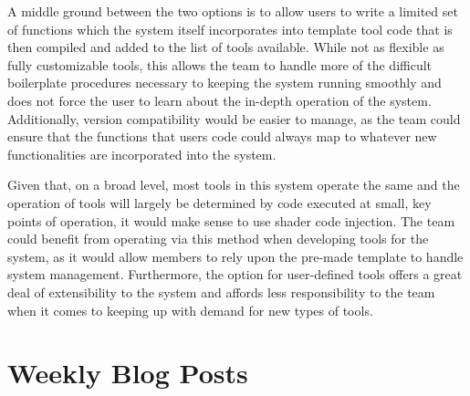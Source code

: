 \documentclass[onecolumn, draftclsnofoot,10pt, compsoc]{IEEEtran}
\newcounter{threesection}[subsubsection]
\begin{document}

A middle ground between the two options is to allow users to write a limited set of functions which the system itself incorporates into template tool code that is then compiled and added to the list of tools available.
While not as flexible as fully customizable tools, this allows the team to handle more of the difficult boilerplate procedures necessary to keeping the system running smoothly and does not force the user to learn about the in-depth operation of the system.
Additionally, version compatibility would be easier to manage, as the team could ensure that the functions that users code could always map to whatever new functionalities are incorporated into the system.




Given that, on a broad level, most tools in this system operate the same and the operation of tools will largely be determined by code executed at small, key points of operation, it would make sense to use shader code injection.
The team could benefit from operating via this method when developing tools for the system, as it would allow members to rely upon the pre-made template to handle system management.
Furthermore, the option for user-defined tools offers a great deal of extensibility to the system and affords less responsibility to the team when it comes to keeping up with demand for new types of tools.
%

\section{Weekly Blog Posts}
\end{document}
